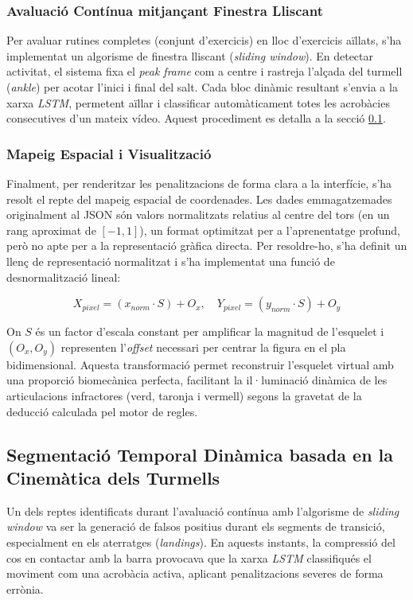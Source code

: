 \documentclass[10pt,a4paper,twocolumn,twoside]{article}
\begin{document}
\subsubsection{Avaluació Contínua mitjançant Finestra Lliscant}
Per avaluar rutines completes (conjunt d'exercicis) en lloc d'exercicis aïllats, s'ha implementat un algorisme de finestra lliscant (\textit{sliding window}). En detectar activitat, el sistema fixa el \textit{peak frame} com a centre i rastreja l'alçada del turmell (\textit{ankle}) per acotar l'inici i final del salt. Cada bloc dinàmic resultant s'envia a la xarxa \textit{LSTM}, permetent aïllar i classificar automàticament totes les acrobàcies consecutives d'un mateix vídeo. Aquest procediment es detalla a la secció \ref{sec:seg_cine}.

\subsubsection{Mapeig Espacial i Visualització}
Finalment, per renderitzar les penalitzacions de forma clara a la interfície, s'ha resolt el repte del mapeig espacial de coordenades. Les dades emmagatzemades originalment al JSON són valors normalitzats relatius al centre del tors (en un rang aproximat de $[-1, 1]$), un format optimitzat per a l'aprenentatge profund, però no apte per a la representació gràfica directa. Per resoldre-ho, s'ha definit un llenç de representació normalitzat i s'ha implementat una funció de desnormalització lineal:

\begin{equation}
    X_{pixel} = (x_{norm} \cdot S) + O_x, \quad Y_{pixel} = (y_{norm} \cdot S) + O_y
\end{equation}

On $S$ és un factor d'escala constant per amplificar la magnitud de l'esquelet i $(O_x, O_y)$ representen l'\textit{offset} necessari per centrar la figura en el pla bidimensional. Aquesta transformació permet reconstruir l'esquelet virtual amb una proporció biomecànica perfecta, facilitant la il·luminació dinàmica de les articulacions infractores (verd, taronja i vermell) segons la gravetat de la deducció calculada pel motor de regles.

\subsection{Segmentació Temporal Dinàmica basada en la Cinemàtica dels Turmells}
\label{sec:seg_cine}
Un dels reptes identificats durant l'avaluació contínua amb l'algorisme de \textit{sliding window} va ser la generació de falsos positius durant els segments de transició, especialment en els aterratges (\textit{landings}). En aquests instants, la compressió del cos en contactar amb la barra provocava que la xarxa \textit{LSTM} classifiqués el moviment com una acrobàcia activa, aplicant penalitzacions severes de forma errònia.
\end{document}
